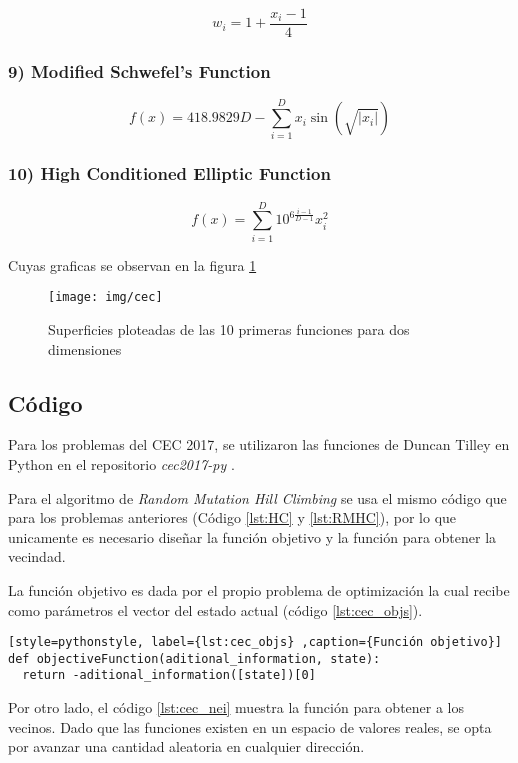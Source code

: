 \documentclass[12pt,twoside]{article}
\begin{document}
	\[
	w_i = 1 + \frac{x_i - 1}{4}
	\]
	
	\subsubsection*{9) Modified Schwefel's Function}
	\[
	f(x) = 418.9829 D - \sum_{i=1}^{D} x_i \sin(\sqrt{|x_i|})
	\]
	
	\subsubsection*{10) High Conditioned Elliptic Function}
	\[
	f(x) = \sum_{i=1}^{D} 10^{6 \frac{i-1}{D-1}} x_i^2
	\]
	
	Cuyas graficas se observan en la figura \ref{fig:cec}
	
	\begin{figure}
		\centering
		\texttt{[image: img/cec]}
		\caption{Superficies ploteadas de las 10 primeras funciones para dos dimensiones \cite{plot}}
		\label{fig:cec}
	\end{figure}
	
\subsection{Código}

Para los problemas del CEC 2017, se utilizaron las funciones de Duncan Tilley en Python en el repositorio \textit{cec2017-py} \cite{git}.

Para el algoritmo de \textit{Random Mutation Hill Climbing} se usa el mismo código que para los problemas anteriores (Código \ref{lst:HC} y \ref{lst:RMHC}), por lo que unicamente es necesario diseñar la función objetivo y la función para obtener la vecindad.

La función objetivo es dada por el propio problema de optimización la cual recibe como parámetros el vector del estado actual (código \ref{lst:cec_objs}).

\begin{lstlisting}[style=pythonstyle, label={lst:cec_objs} ,caption={Función objetivo}]
def objectiveFunction(aditional_information, state):
  return -aditional_information([state])[0]
\end{lstlisting}

Por otro lado, el código \ref{lst:cec_nei} muestra la función para obtener a los vecinos. Dado que las funciones existen en un espacio de valores reales, se opta por avanzar una cantidad aleatoria en cualquier dirección.
\end{document}
